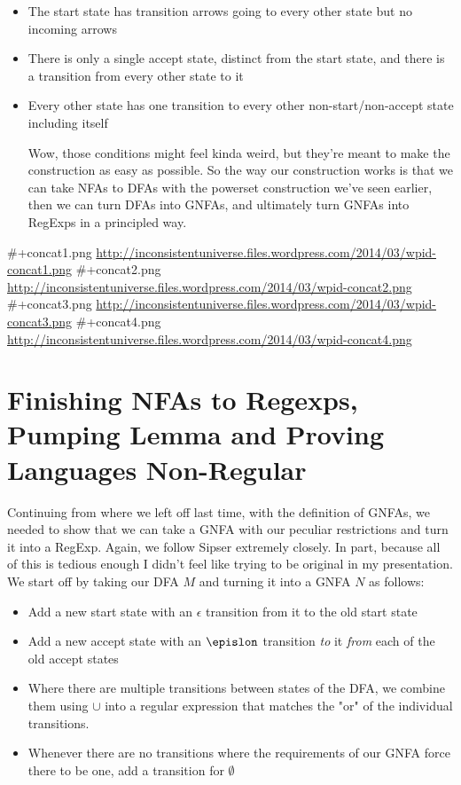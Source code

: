\documentclass[11pt]{article}
\begin{document}
\begin{itemize}
\item The start state has transition arrows going to every other state but no incoming arrows
\item There is only a single accept state, distinct from the start state, and there is a transition from every other state to it
\item Every other state has one transition to every other non-start/non-accept state including itself

Wow, those conditions might feel kinda weird, but they're meant to make the construction as easy as possible. So the way our construction works is that we can take NFAs to DFAs with the powerset construction we've seen earlier, then we can turn DFAs into GNFAs, and ultimately turn GNFAs into RegExps in a principled way.
\end{itemize}
\#+concat1.png \url{http://inconsistentuniverse.files.wordpress.com/2014/03/wpid-concat1.png}
\#+concat2.png \url{http://inconsistentuniverse.files.wordpress.com/2014/03/wpid-concat2.png}
\#+concat3.png \url{http://inconsistentuniverse.files.wordpress.com/2014/03/wpid-concat3.png}
\#+concat4.png \url{http://inconsistentuniverse.files.wordpress.com/2014/03/wpid-concat4.png}
\section{Finishing NFAs to Regexps, Pumping Lemma and Proving Languages Non-Regular}
\label{sec-5}
Continuing from where we left off last time, with the definition of GNFAs, we needed to show that we can take a GNFA with our peculiar restrictions and turn it into a RegExp. Again, we follow Sipser extremely closely. In part, because all of this is tedious enough I didn't feel like trying to be original in my presentation. We start off by taking our DFA $M$ and turning it into a GNFA $N$ as follows: 

\begin{itemize}
\item Add a new start state with an $\epsilon$ transition from it to the old start state
\item Add a new accept state with an $\epislon$ transition \emph{to} it \emph{from} each of the old accept states
\item Where there are multiple transitions between states of the DFA, we combine them using $\cup$ into a regular expression that matches the "or" of the individual transitions.
\item Whenever there are no transitions where the requirements of our GNFA force there to be one, add a transition for $\emptyset$
\end{itemize}
\end{document}
